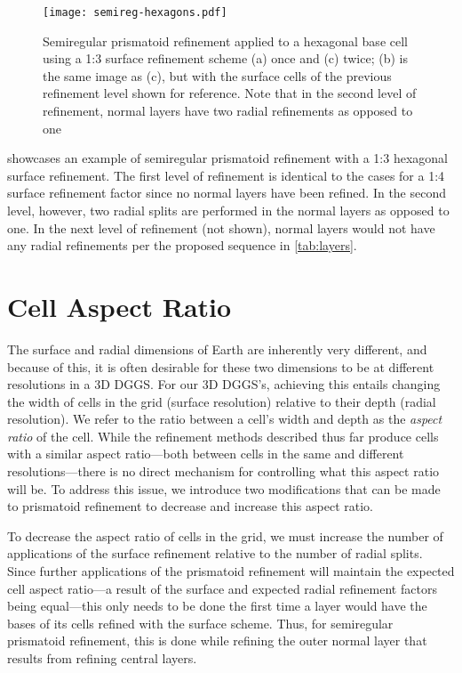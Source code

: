 \begin{figure}[ht!]
	\centering
	\texttt{[image: semireg-hexagons.pdf]}
	\caption[Semiregular prismatoid refinement for hexagons]{
		Semiregular prismatoid refinement applied to a hexagonal base cell using a 1:3 surface refinement scheme (a) once and (c) twice; (b) is the same image as (c), but with the surface cells of the previous refinement level shown for reference.
		Note that in the second level of refinement, normal layers have two radial refinements as opposed to one
	}
	\label{fig:hexagons}
\end{figure}


 showcases an example of semiregular prismatoid refinement with a 1:3 hexagonal surface refinement.
The first level of refinement is identical to the cases for a 1:4 surface refinement factor since no normal layers have been refined.
In the second level, however, two radial splits are performed in the normal layers as opposed to one.
In the next level of refinement (not shown), normal layers would not have any radial refinements per the proposed sequence in \cref{tab:layers}.


\section{Cell Aspect Ratio} \label{chap:5:ar}
The surface and radial dimensions of Earth are inherently very different, and because of this, it is often desirable for these two dimensions to be at different resolutions in a 3D DGGS.
For our 3D DGGS's, achieving this entails changing the width of cells in the grid (surface resolution) relative to their depth (radial resolution).
We refer to the ratio between a cell's width and depth as the \textit{aspect ratio} of the cell.
While the refinement methods described thus far produce cells with a similar aspect ratio---both between cells in the same and different resolutions---there is no direct mechanism for controlling what this aspect ratio will be.
To address this issue, we introduce two modifications that can be made to prismatoid refinement to decrease and increase this aspect ratio.


To decrease the aspect ratio of cells in the grid, we must increase the number of applications of the surface refinement relative to the number of radial splits.
Since further applications of the prismatoid refinement will maintain the expected cell aspect ratio---a result of the surface and expected radial refinement factors being equal---this only needs to be done the first time a layer would have the bases of its cells refined with the surface scheme.
Thus, for semiregular prismatoid refinement, this is done while refining the outer normal layer that results from refining central layers.


